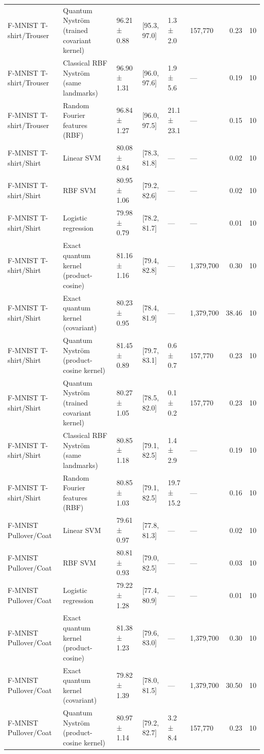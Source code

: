 \begin{table}
\begin{tabular}{llllllrr}
F-MNIST T-shirt/Trouser & Quantum Nyström (trained covariant kernel) & 96.21 ± 0.88 & [95.3, 97.0] & 1.3 ± 2.0 & 157,770 & 0.23 & 10 \\
F-MNIST T-shirt/Trouser & Classical RBF Nyström (same landmarks) & 96.90 ± 1.31 & [96.0, 97.6] & 1.9 ± 5.6 & — & 0.19 & 10 \\
F-MNIST T-shirt/Trouser & Random Fourier features (RBF) & 96.84 ± 1.27 & [96.0, 97.5] & 21.1 ± 23.1 & — & 0.15 & 10 \\
F-MNIST T-shirt/Shirt & Linear SVM & 80.08 ± 0.84 & [78.3, 81.8] & — & — & 0.02 & 10 \\
F-MNIST T-shirt/Shirt & RBF SVM & 80.95 ± 1.06 & [79.2, 82.6] & — & — & 0.02 & 10 \\
F-MNIST T-shirt/Shirt & Logistic regression & 79.98 ± 0.79 & [78.2, 81.7] & — & — & 0.01 & 10 \\
F-MNIST T-shirt/Shirt & Exact quantum kernel (product-cosine) & 81.16 ± 1.16 & [79.4, 82.8] & — & 1,379,700 & 0.30 & 10 \\
F-MNIST T-shirt/Shirt & Exact quantum kernel (covariant) & 80.23 ± 0.95 & [78.4, 81.9] & — & 1,379,700 & 38.46 & 10 \\
F-MNIST T-shirt/Shirt & Quantum Nyström (product-cosine kernel) & 81.45 ± 0.89 & [79.7, 83.1] & 0.6 ± 0.7 & 157,770 & 0.23 & 10 \\
F-MNIST T-shirt/Shirt & Quantum Nyström (trained covariant kernel) & 80.27 ± 1.05 & [78.5, 82.0] & 0.1 ± 0.2 & 157,770 & 0.23 & 10 \\
F-MNIST T-shirt/Shirt & Classical RBF Nyström (same landmarks) & 80.85 ± 1.18 & [79.1, 82.5] & 1.4 ± 2.9 & — & 0.19 & 10 \\
F-MNIST T-shirt/Shirt & Random Fourier features (RBF) & 80.85 ± 1.03 & [79.1, 82.5] & 19.7 ± 15.2 & — & 0.16 & 10 \\
F-MNIST Pullover/Coat & Linear SVM & 79.61 ± 0.97 & [77.8, 81.3] & — & — & 0.02 & 10 \\
F-MNIST Pullover/Coat & RBF SVM & 80.81 ± 0.93 & [79.0, 82.5] & — & — & 0.03 & 10 \\
F-MNIST Pullover/Coat & Logistic regression & 79.22 ± 1.28 & [77.4, 80.9] & — & — & 0.01 & 10 \\
F-MNIST Pullover/Coat & Exact quantum kernel (product-cosine) & 81.38 ± 1.23 & [79.6, 83.0] & — & 1,379,700 & 0.30 & 10 \\
F-MNIST Pullover/Coat & Exact quantum kernel (covariant) & 79.82 ± 1.39 & [78.0, 81.5] & — & 1,379,700 & 30.50 & 10 \\
F-MNIST Pullover/Coat & Quantum Nyström (product-cosine kernel) & 80.97 ± 1.14 & [79.2, 82.7] & 3.2 ± 8.4 & 157,770 & 0.23 & 10 \\

\end{tabular}
\end{table}
